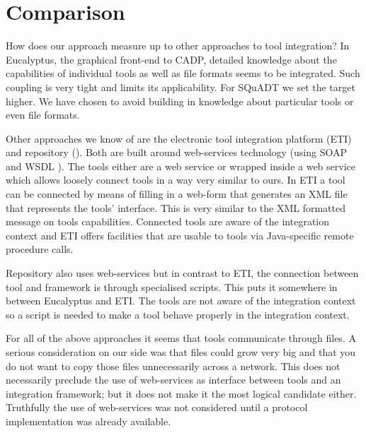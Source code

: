 \documentclass{article}
\newcommand{\squadt}{SQuADT\xspace}
\begin{document}

  \section{Comparison}

   How does our approach measure up to other approaches to tool integration?  In
   Eucalyptus, the graphical front-end to CADP, detailed knowledge about the
   capabilities of individual tools as well as file formats seems to be
   integrated. Such coupling is very tight and limits its applicability. For
   \squadt we set the target higher. We have chosen to avoid building in
   knowledge about particular tools or even file formats.

   Other approaches we know of are the electronic tool integration platform
   (ETI) \cite{RICVT} and repository (\cite{SFAV}). Both are built around
   web-services technology (using SOAP \cite{SOAP} and WSDL \cite{2001-WSDL}).
   The tools either are a web service or wrapped inside a web service which
   allows loosely connect tools in a way very similar to ours. In ETI a tool
   can be connected by means of filling in a web-form that generates an XML
   file that represents the tools' interface.  This is very similar to the XML
   formatted message on tools capabilities. Connected tools are aware of the
   integration context and ETI offers facilities that are usable to tools via
   Java-specific remote procedure calls.

   Repository also uses web-services but in contrast to ETI, the connection
   between tool and framework is through specialised scripts. This puts it
   somewhere in between Eucalyptus and ETI. The tools are not aware of the
   integration context so a script is needed to make a tool behave properly in
   the integration context.

   For all of the above approaches it seems that tools communicate through
   files.  A serious consideration on our side was that files could grow very
   big and that you do not want to copy those files unnecessarily across a
   network. This does not necessarily preclude the use of web-services as
   interface between tools and an integration framework; but it does not make
   it the most logical candidate either. Truthfully the use of web-services was
   not considered until a protocol implementation was already available.
\end{document}
